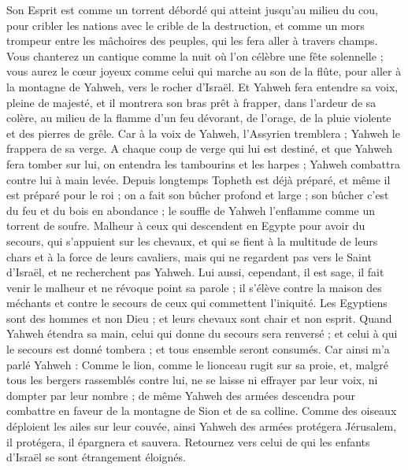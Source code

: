 \begin{multicols}{2}
Son Esprit est comme un torrent débordé qui atteint jusqu'au milieu du cou, pour cribler les nations avec le crible de la destruction, et comme un mors trompeur entre les mâchoires des peuples, qui les fera aller à travers champs.
Vous chanterez un cantique comme la nuit où l'on célèbre une fête solennelle ; vous aurez le cœur joyeux comme celui qui marche au son de la flûte, pour aller à la montagne de Yahweh, vers le rocher d'Israël.
Et Yahweh fera entendre sa voix, pleine de majesté, et il montrera son bras prêt à frapper, dans l'ardeur de sa colère, au milieu de la flamme d'un feu dévorant, de l'orage, de la pluie violente et des pierres de grêle.
Car à la voix de Yahweh, l'Assyrien tremblera ; Yahweh le frappera de sa verge.
A chaque coup de verge qui lui est destiné, et que Yahweh fera tomber sur lui, on entendra les tambourins et les harpes ; Yahweh combattra contre lui à main levée.
Depuis longtemps Topheth est déjà préparé, et même il est préparé pour le roi ; on a fait son bûcher profond et large ; son bûcher c'est du feu et du bois en abondance ; le souffle de Yahweh l'enflamme comme un torrent de soufre.
\VerseOne{}Malheur à ceux qui descendent en Egypte pour avoir du secours, qui s'appuient sur les chevaux, et qui se fient à la multitude de leurs chars et à la force de leurs cavaliers, mais qui ne regardent pas vers le Saint d'Israël, et ne recherchent pas Yahweh.
Lui aussi, cependant, il est sage, il fait venir le malheur et ne révoque point sa parole ; il s'élève contre la maison des méchants et contre le secours de ceux qui commettent l'iniquité.
Les Egyptiens sont des hommes et non Dieu ; et leurs chevaux sont chair et non esprit. Quand Yahweh étendra sa main, celui qui donne du secours sera renversé ; et celui à qui le secours est donné tombera ; et tous ensemble seront consumés.
Car ainsi m'a parlé Yahweh : Comme le lion, comme le lionceau rugit sur sa proie, et, malgré tous les bergers rassemblés contre lui, ne se laisse ni effrayer par leur voix, ni dompter par leur nombre ; de même Yahweh des armées descendra pour combattre en faveur de la montagne de Sion et de sa colline.
Comme des oiseaux déploient les ailes sur leur couvée, ainsi Yahweh des armées protégera Jérusalem, il protégera, il épargnera et sauvera.
Retournez vers celui de qui les enfants d'Israël se sont étrangement éloignés.

\end{multicols}
